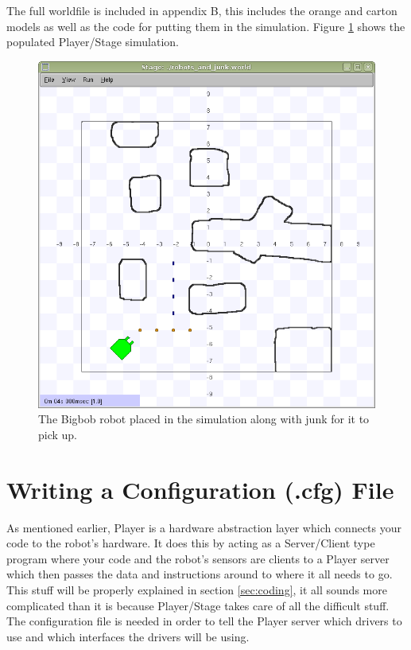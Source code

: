 \documentclass[a4paper]{report}
\newcommand{\plst}{Player/Stage\xspace}
\newcommand{\pl}{Player\xspace}
\begin{document}
The full worldfile is included in appendix B, this includes the orange and carton models as well as the code for putting them in the simulation. Figure \ref{fig:finalRobotandStuff} shows the populated \plst simulation.

\begin{figure}
	\centering
	\includegraphics[width=0.8\linewidth]{./pics/oranges_box/final_robot_and_stuff.png} 
	\caption{The Bigbob robot placed in the simulation along with junk for it to pick up.}
	\label{fig:finalRobotandStuff}
\end{figure}

\chapter{Writing a Configuration (.cfg) File} \label{sec:WritingConfigurationFile}

As mentioned earlier, \pl is a hardware abstraction layer which connects your code to the robot's hardware. It does this by acting as a Server/Client type program where your code and the robot's sensors are clients to a \pl server which then passes the data and instructions around to where it all needs to go. This stuff will be properly explained in section \ref{sec:coding}, it all sounds more complicated than it is because \plst takes care of all the difficult stuff. The configuration file is needed in order to tell the \pl server which drivers to use and which interfaces the drivers will be using.
\end{document}
